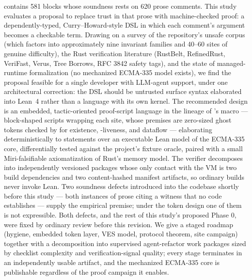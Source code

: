 \noindent \dotnetrs{} contains 581  blocks whose
soundness rests on 620 prose \safetyc{} comments. This study evaluates
a proposal to replace trust in that prose with machine-checked proof:
a dependently-typed, Curry--Howard-style DSL in which each comment's
argument becomes a checkable term. Drawing on a survey of the
repository's unsafe corpus (which factors into approximately nine
invariant families and 40--60 sites of genuine difficulty), the Rust
verification literature (RustBelt, RefinedRust, VeriFast, Verus, Tree
Borrows, RFC 3842 safety tags), and the state of managed-runtime
formalization (no mechanized ECMA-335 model exists), we find the
proposal feasible for a single developer with LLM-agent support, under
one architectural correction: the DSL should be untrusted surface
syntax elaborated into Lean~4 rather than a language with its own
kernel. The recommended design is an embedded, tactic-oriented
proof-script language in the lineage of 's 
macro --- block-shaped scripts wrapping each  site, whose
premises are zero-sized ghost tokens checked by  for
existence, -liveness, and dataflow --- elaborating
deterministically to statements over an executable Lean model of the
ECMA-335 core, differentially tested against the project's fixture
oracle, paired with a small Miri-falsifiable axiomatization of Rust's
memory model. The verifier decomposes into independently versioned
packages whose only contact with the VM is two build dependencies and
two content-hashed manifest artifacts, so ordinary builds never invoke
Lean. Two soundness defects introduced into the codebase shortly
before this study --- both instances of prose citing a witness that no
code establishes --- supply the empirical premise; under the token
design one of them is not expressible. Both defects, and the rest of
this study's proposed Phase 0, were fixed by ordinary review before
this revision. We give a staged roadmap
(hygiene, embedded token layer, VES model, protocol theorem, site
campaign) together with a decomposition into supervised agent-refactor
work packages sized by checklist complexity and verification-signal
quality; every stage terminates in an independently usable artifact,
and the mechanized ECMA-335 core is publishable regardless of the
proof campaign it enables.
